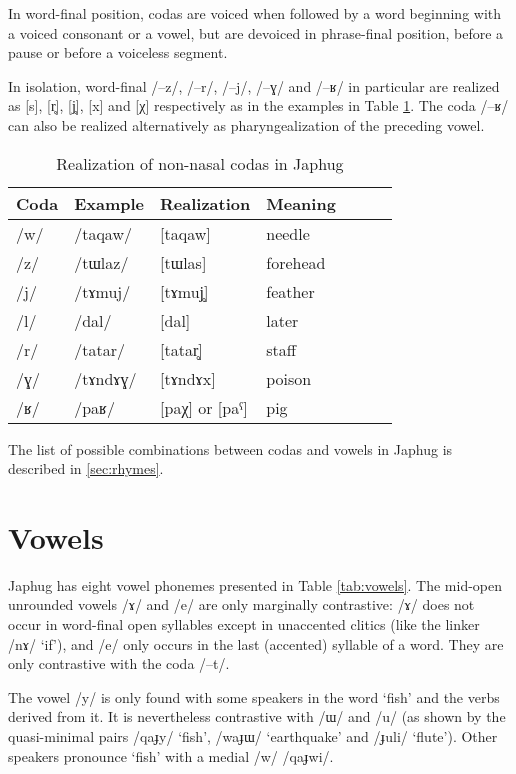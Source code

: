 \documentclass[oldfontcommands,oneside,a4paper,11pt]{article}
\newcommand{\ipa}[1]{{\phon/#1/}} %
\begin{document}
In word-final position, codas are voiced when followed by a word beginning with a voiced consonant or a vowel, but are devoiced in phrase-final position, before a pause or before a voiceless segment.

In isolation, word-final \ipa{--z}, \ipa{--r}, \ipa{--j}, \ipa{--ɣ} and \ipa{--ʁ} in particular are realized as [s], [r̥], [j̥], [x] and [χ] respectively as in the examples in Table \ref{tab:codas}. The coda \ipa{--ʁ} can also be realized alternatively as pharyngealization of the preceding vowel.

\begin{table}
 \caption{Realization of non-nasal  codas in Japhug} \label{tab:codas}  \centering
\begin{tabular}{lllllll}
\toprule
Coda & Example & Realization &Meaning\\
\midrule
\ipa{w} & \ipa{taqaw} &[taqaw] &needle\\
\ipa{z} & \ipa{tɯlaz} &[tɯlas] &forehead\\
\ipa{j} & \ipa{tɤmuj} &[tɤmuj̥] &feather\\
\ipa{l} & \ipa{dal} &[dal] &later\\
\ipa{r} & \ipa{tatar} &[tatar̥] &staff\\
\ipa{ɣ} & \ipa{tɤndɤɣ} &[tɤndɤx] &poison\\
\ipa{ʁ} & \ipa{paʁ} & [paχ] or [paˁ] &pig\\
\bottomrule
\end{tabular}
\end{table}
    
    
    The list of possible combinations between codas and vowels in Japhug is described in \ref{sec:rhymes}.
    
     \section{Vowels} \label{sec:vowels}
     
     
     Japhug has eight vowel phonemes presented in Table \ref{tab:vowels}. The mid-open unrounded vowels \ipa{ɤ} and \ipa{e} are only marginally contrastive: \ipa{ɤ} does not occur in word-final open syllables except in unaccented clitics (like the linker \ipa{nɤ} `if'), and \ipa{e} only occurs in the last (accented) syllable of a word. They are only contrastive with the coda \ipa{--t}.
     
The vowel \ipa{y} is only found with some speakers in the word `fish' and the verbs derived from it. It is nevertheless contrastive with \ipa{ɯ} and \ipa{u} (as shown by the quasi-minimal pairs \ipa{qaɟy} `fish', \ipa{waɟɯ} `earthquake' and \ipa{ɟuli} `flute'). Other speakers pronounce `fish' with a medial \ipa{w} \ipa{qaɟwi}.
     
\end{document}

